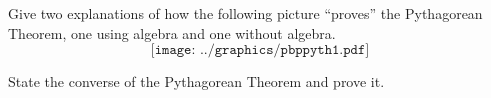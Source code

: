 \begin{prob}
Give two explanations of how the following picture ``proves''
  the Pythagorean Theorem, one using algebra and one without algebra. 
\[
\texttt{[image: ../graphics/pbppyth1.pdf]}
\]
\end{prob}
\vfill

\newpage

\begin{prob}
State the converse of the Pythagorean Theorem and prove it.  
\end{prob}

